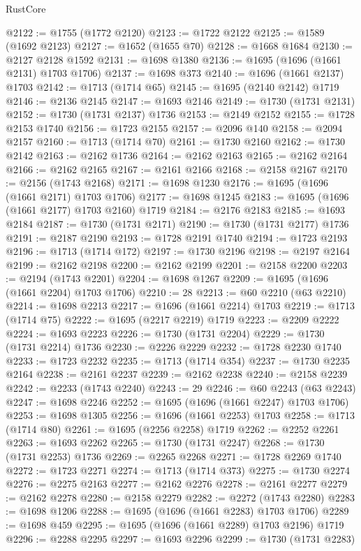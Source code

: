 \begin{lexlean}{RustCore}
\begin{coremodule}
@2122 := @1755 (@1772 @2120)
@2123 := @1722 @2122
@2125 := @1589 (@1692 @2123)
@2127 := @1652 (@1655 @70)
@2128 := @1668 @1684
@2130 := @2127 @2128 @1592
@2131 := @1698 @1380
@2136 := @1695 (@1696 (@1661 @2131) @1703 @1706)
@2137 := @1698 @373
@2140 := @1696 (@1661 @2137) @1703
@2142 := @1713 (@1714 @65)
@2145 := @1695 (@2140 @2142) @1719
@2146 := @2136 @2145
@2147 := @1693 @2146
@2149 := @1730 (@1731 @2131)
@2152 := @1730 (@1731 @2137) @1736
@2153 := @2149 @2152
@2155 := @1728 @2153 @1740
@2156 := @1723 @2155
@2157 := @2096 @140
@2158 := @2094 @2157
@2160 := @1713 (@1714 @70)
@2161 := @1730 @2160
@2162 := @1730 @2142
@2163 := @2162 @1736
@2164 := @2162 @2163
@2165 := @2162 @2164
@2166 := @2162 @2165
@2167 := @2161 @2166
@2168 := @2158 @2167
@2170 := @2156 (@1743 @2168)
@2171 := @1698 @1230
@2176 := @1695 (@1696 (@1661 @2171) @1703 @1706)
@2177 := @1698 @1245
@2183 := @1695 (@1696 (@1661 @2177) @1703 @2160) @1719
@2184 := @2176 @2183
@2185 := @1693 @2184
@2187 := @1730 (@1731 @2171)
@2190 := @1730 (@1731 @2177) @1736
@2191 := @2187 @2190
@2193 := @1728 @2191 @1740
@2194 := @1723 @2193
@2196 := @1713 (@1714 @172)
@2197 := @1730 @2196
@2198 := @2197 @2164
@2199 := @2162 @2198
@2200 := @2162 @2199
@2201 := @2158 @2200
@2203 := @2194 (@1743 @2201)
@2204 := @1698 @1267
@2209 := @1695 (@1696 (@1661 @2204) @1703 @1706)
@2210 := 28
@2213 := @60 @2210 (@63 @2210)
@2214 := @1698 @2213
@2217 := @1696 (@1661 @2214) @1703
@2219 := @1713 (@1714 @75)
@2222 := @1695 (@2217 @2219) @1719
@2223 := @2209 @2222
@2224 := @1693 @2223
@2226 := @1730 (@1731 @2204)
@2229 := @1730 (@1731 @2214) @1736
@2230 := @2226 @2229
@2232 := @1728 @2230 @1740
@2233 := @1723 @2232
@2235 := @1713 (@1714 @354)
@2237 := @1730 @2235 @2164
@2238 := @2161 @2237
@2239 := @2162 @2238
@2240 := @2158 @2239
@2242 := @2233 (@1743 @2240)
@2243 := 29
@2246 := @60 @2243 (@63 @2243)
@2247 := @1698 @2246
@2252 := @1695 (@1696 (@1661 @2247) @1703 @1706)
@2253 := @1698 @1305
@2256 := @1696 (@1661 @2253) @1703
@2258 := @1713 (@1714 @80)
@2261 := @1695 (@2256 @2258) @1719
@2262 := @2252 @2261
@2263 := @1693 @2262
@2265 := @1730 (@1731 @2247)
@2268 := @1730 (@1731 @2253) @1736
@2269 := @2265 @2268
@2271 := @1728 @2269 @1740
@2272 := @1723 @2271
@2274 := @1713 (@1714 @373)
@2275 := @1730 @2274
@2276 := @2275 @2163
@2277 := @2162 @2276
@2278 := @2161 @2277
@2279 := @2162 @2278
@2280 := @2158 @2279
@2282 := @2272 (@1743 @2280)
@2283 := @1698 @1206
@2288 := @1695 (@1696 (@1661 @2283) @1703 @1706)
@2289 := @1698 @459
@2295 := @1695 (@1696 (@1661 @2289) @1703 @2196) @1719
@2296 := @2288 @2295
@2297 := @1693 @2296
@2299 := @1730 (@1731 @2283)

\end{coremodule}
\end{lexlean}
